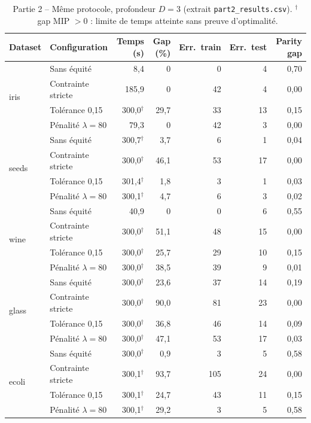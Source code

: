 \documentclass[a4paper,10pt,titlepage,leqno]{article}
\begin{document}
\begin{table}[H]
\centering
\caption{Partie 2 -- Même protocole, profondeur $D=3$ (extrait \texttt{part2\_results.csv}). $^\dagger$~gap MIP $>0$ : limite de temps atteinte sans preuve d'optimalité.}
\label{tab:part2d3}
\small
\begin{tabular}{@{}l l r r r r r@{}}
\toprule
Dataset & Configuration & Temps (s) & Gap (\%) & Err.\ train & Err.\ test & Parity gap \\
\midrule
\multirow{4}{*}{iris}
 & Sans équité        & 8{,}4  & 0 & 0 & 4 & 0{,}70 \\
 & Contrainte stricte & 185{,}9 & 0 & 42 & 4 & 0{,}00 \\
 & Tolérance 0{,}15   & 300{,}0$^\dagger$ & 29{,}7 & 33 & 13 & 0{,}15 \\
 & Pénalité $\lambda{=}80$ & 79{,}3 & 0 & 42 & 3 & 0{,}00 \\
\midrule
\multirow{4}{*}{seeds}
 & Sans équité        & 300{,}7$^\dagger$ & 3{,}7 & 6 & 1 & 0{,}04 \\
 & Contrainte stricte & 300{,}0$^\dagger$ & 46{,}1 & 53 & 17 & 0{,}00 \\
 & Tolérance 0{,}15   & 301{,}4$^\dagger$ & 1{,}8 & 3 & 1 & 0{,}03 \\
 & Pénalité $\lambda{=}80$ & 300{,}1$^\dagger$ & 4{,}7 & 6 & 3 & 0{,}02 \\
\midrule
\multirow{4}{*}{wine}
 & Sans équité        & 40{,}9 & 0 & 0 & 6 & 0{,}55 \\
 & Contrainte stricte & 300{,}0$^\dagger$ & 51{,}1 & 48 & 15 & 0{,}00 \\
 & Tolérance 0{,}15   & 300{,}0$^\dagger$ & 25{,}7 & 29 & 10 & 0{,}15 \\
 & Pénalité $\lambda{=}80$ & 300{,}0$^\dagger$ & 38{,}5 & 39 & 9 & 0{,}01 \\
\midrule
\multirow{4}{*}{glass}
 & Sans équité        & 300{,}0$^\dagger$ & 23{,}6 & 37 & 14 & 0{,}19 \\
 & Contrainte stricte & 300{,}0$^\dagger$ & 90{,}0 & 81 & 23 & 0{,}00 \\
 & Tolérance 0{,}15   & 300{,}0$^\dagger$ & 36{,}8 & 46 & 14 & 0{,}09 \\
 & Pénalité $\lambda{=}80$ & 300{,}0$^\dagger$ & 47{,}1 & 53 & 17 & 0{,}03 \\
\midrule
\multirow{4}{*}{ecoli}
 & Sans équité        & 300{,}0$^\dagger$ & 0{,}9 & 3 & 5 & 0{,}58 \\
 & Contrainte stricte & 300{,}1$^\dagger$ & 93{,}7 & 105 & 24 & 0{,}00 \\
 & Tolérance 0{,}15   & 300{,}1$^\dagger$ & 24{,}7 & 43 & 11 & 0{,}15 \\
 & Pénalité $\lambda{=}80$ & 300{,}1$^\dagger$ & 29{,}2 & 3 & 5 & 0{,}58 \\
\bottomrule
\end{tabular}
\end{table}
\end{document}
